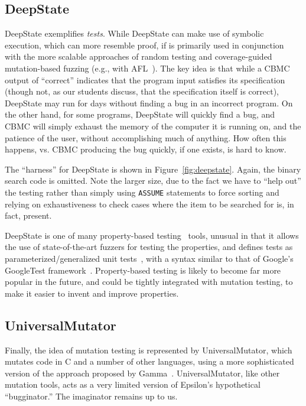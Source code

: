 \documentclass[sigplan]{acmart}
\begin{document}
\subsection{DeepState}

DeepState exemplifies \emph{tests}.  While DeepState can make use of
symbolic execution, which can more resemble proof, if is primarily
used in conjunction with the more scalable approaches of random
testing and coverage-guided mutation-based fuzzing (e.g., with AFL~\cite{aflfuzz}).  The key idea is that while a
CBMC output of ``correct'' indicates that the program input satisfies
its specification (though not, as our students discuss, that the
specification itself is correct), DeepState may run for days without
finding a bug in an incorrect program.  On the other hand, for some
programs, DeepState will quickly find a bug, and CBMC will simply
exhaust the memory of the computer it is running on, and the patience
of the user, without accomplishing much of anything.  How often this
happens, vs. CBMC producing the bug quickly, if one exists, is hard to
know.

The ``harness'' for DeepState is shown in Figure~\ref{fig:deepstate}.
Again, the binary search code is omitted.  Note the larger size, due to the fact we
have to ``help out'' the testing rather than simply using {\tt ASSUME}
statements to force sorting and relying on exhaustiveness to check cases
where the item to be searched for is, in fact, present.

DeepState is one of many property-based testing~\cite{ClaessenH00,goldstein2024property} tools, unusual in that
it allows the use of state-of-the-art fuzzers for testing the
properties, and defines tests as parameterized/generalized unit
tests~\cite{ParamUnit}, with a syntax similar to that of Google's
GoogleTest framework~\cite{GoogleTest}.  Property-based testing is
likely to become far more popular in the future, and could be tightly integrated
with mutation testing, to make it easier to invent and
improve properties.

\subsection{UniversalMutator}

Finally, the idea of mutation testing is represented by UniversalMutator, which mutates code
in C and a number of other languages, using a more sophisticated
version of the approach proposed by Gamma~\cite{SyntaxUM}.  UniversalMutator, like other
mutation tools, acts as a very limited version of Epsilon's
hypothetical 
``bugginator.''  The imaginator remains up to us.




\end{document}
